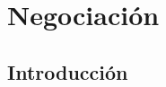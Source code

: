 \documentclass[a4paper,slidestop,xcolor=pst,dvips,blue]{beamer}
\begin{document}
%
%
%

\section{Negociación}

\subsection{Introducción}
\end{document}
